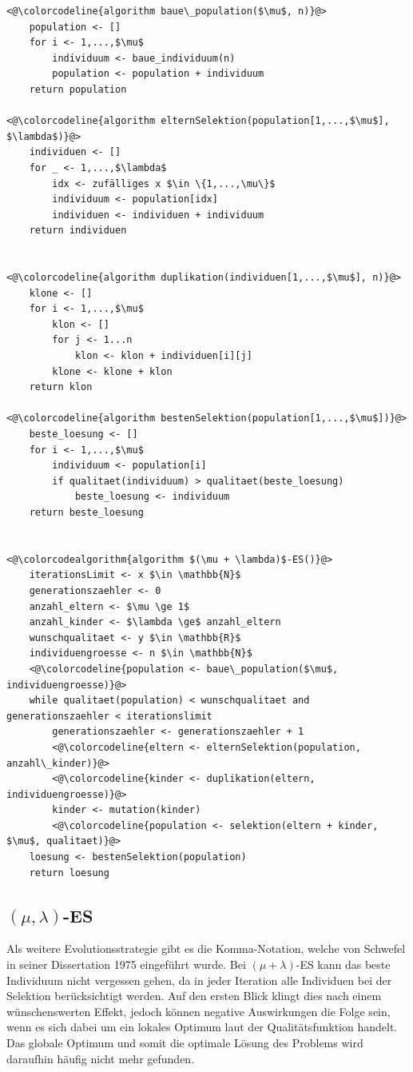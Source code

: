 \begin{lstlisting}[caption={$(\mu + \lambda)$-Evolutionsstrategie}, firstnumber=1, captionpos=b, label=lst:mu_und_lambda_es]
<@\colorcodeline{algorithm baue\_population($\mu$, n)}@>
	population <- []
	for i <- 1,...,$\mu$
		individuum <- baue_individuum(n)
		population <- population + individuum
	return population
	
<@\colorcodeline{algorithm elternSelektion(population[1,...,$\mu$], $\lambda$)}@>
	individuen <- []
	for _ <- 1,...,$\lambda$
		idx <- zufälliges x $\in \{1,...,\mu\}$
		individuum <- population[idx]
		individuen <- individuen + individuum
	return individuen
	

<@\colorcodeline{algorithm duplikation(individuen[1,...,$\mu$], n)}@>
	klone <- []
	for i <- 1,...,$\mu$
		klon <- []
		for j <- 1...n
			klon <- klon + individuen[i][j]
		klone <- klone + klon
	return klon
	
<@\colorcodeline{algorithm bestenSelektion(population[1,...,$\mu$])}@>
	beste_loesung <- []
	for i <- 1,...,$\mu$
		individuum <- population[i]
		if qualitaet(individuum) > qualitaet(beste_loesung)
			beste_loesung <- individuum
	return beste_loesung
	

<@\colorcodealgorithm{algorithm $(\mu + \lambda)$-ES()}@>
	iterationsLimit <- x $\in \mathbb{N}$
	generationszaehler <- 0
	anzahl_eltern <- $\mu \ge 1$
	anzahl_kinder <- $\lambda \ge$ anzahl_eltern
	wunschqualitaet <- y $\in \mathbb{R}$
	individuengroesse <- n $\in \mathbb{N}$
	<@\colorcodeline{population <- baue\_population($\mu$, individuengroesse)}@>
	while qualitaet(population) < wunschqualitaet and generationszaehler < iterationslimit
		generationszaehler <- generationszaehler + 1
		<@\colorcodeline{eltern <- elternSelektion(population, anzahl\_kinder)}@>
		<@\colorcodeline{kinder <- duplikation(eltern, individuengroesse)}@>
		kinder <- mutation(kinder)
		<@\colorcodeline{population <- selektion(eltern + kinder, $\mu$, qualitaet)}@>
	loesung <- bestenSelektion(population)
	return loesung
\end{lstlisting}

\subsection{$(\mu, \lambda)$-ES}

Als weitere Evolutionsstrategie gibt es die Komma-Notation, welche von Schwefel in seiner Dissertation 1975 eingeführt wurde. Bei $(\mu + \lambda)$-ES kann das beste Individuum nicht vergessen gehen, da in jeder Iteration alle Individuen bei der Selektion berücksichtigt werden. Auf den ersten Blick klingt dies nach einem wünschenswerten Effekt, jedoch können negative Auswirkungen die Folge sein, wenn es sich dabei um ein lokales Optimum laut der Qualitätsfunktion handelt.
Das globale Optimum und somit die optimale Lösung des Problems wird daraufhin häufig nicht mehr gefunden.

